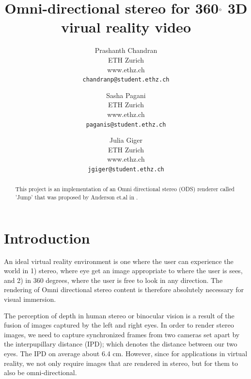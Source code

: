 \documentclass[10pt,twocolumn,letterpaper]{article}
\begin{document}
\title{Omni-directional stereo for 360$\degree$ 3D virual reality video}

\author{Prashanth Chandran\\
ETH Zurich\\
www.ethz.ch\\
{\tt\small chandranp@student.ethz.ch}
\and
Sasha Pagani\\
ETH Zurich\\
www.ethz.ch\\
{\tt\small paganis@student.ethz.ch}
\and
Julia Giger\\
ETH Zurich\\
www.ethz.ch\\
{\tt\small jgiger@student.ethz.ch}
}

\maketitle

\begin{abstract}
   This project is an implementation of an Omni directional stereo (ODS) renderer called 'Jump' that was proposed by Anderson et.al in \cite{jump16}.  
\end{abstract}

\section{Introduction}

An ideal virtual reality environment is one where the user can experience the world in 1) stereo, where eye get an image appropriate to where the user is sees, and 2) in 360 degrees, where the user is free to look in any direction. The rendering of Omni directional stereo content is therefore absolutely necessary for visual immersion. 

The perception of depth in human stereo or binocular vision is a result of the fusion of images captured by the left and right eyes. 
In order to render stereo images, we need to capture synchronized frames from two cameras set apart by the interpupillary distance (IPD); which denotes the distance between our two eyes. The IPD on average about 6.4 cm. However, since for applications in virtual reality, we not only require images that are rendered in stereo, but for them to also be omni-directional. 
\end{document}
